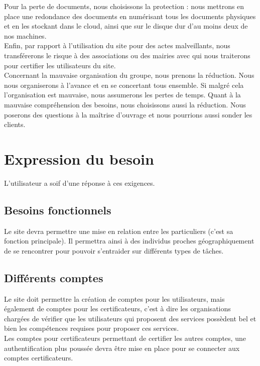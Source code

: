 \documentclass[a4paper,11pt]{article}
\begin{document}
Pour la perte de documents, nous choisissons la protection : nous mettrons en place une redondance
des documents en numérisant tous les documents physiques et en les stockant dans le cloud, ainsi
que sur le disque dur d’au moins deux de nos machines.\\

Enfin, par rapport à l’utilisation du site pour des actes malveillants, nous transférerons le risque à des
associations ou des mairies avec qui nous traiterons pour certifier les utilisateurs du site.\\

Concernant la mauvaise organisation du groupe, nous prenons la réduction. Nous nous organiserons
à l'avance et en se concertant tous ensemble. Si malgré cela l'organisation est mauvaise, nous
assumerons les pertes de temps. Quant à la mauvaise compréhension des besoins, nous choisissons
aussi la réduction. Nous poserons des questions à la maîtrise d'ouvrage et nous pourrions aussi sonder
les clients.\\

\section{Expression du besoin}

L’utilisateur a soif d’une réponse à ces exigences.

\subsection{Besoins fonctionnels}

Le site devra permettre une mise en relation entre les particuliers (c’est sa fonction principale). Il
permettra ainsi à des individus proches géographiquement de se rencontrer pour pouvoir s’entraider
sur différents types de tâches.\\

\subsection{Différents comptes}

Le site doit permettre la création de comptes pour les utilisateurs, mais également de comptes
pour les certificateurs, c'est à dire les organisations chargées de vérifier que les utilisateurs
qui proposent des services possèdent bel et bien les compétences requises pour proposer ces services.\\

Les comptes pour certificateurs permettant de certifier les autres comptes, une authentification
plus poussée devra être mise en place pour se connecter aux comptes certificateurs.\\
\end{document}
